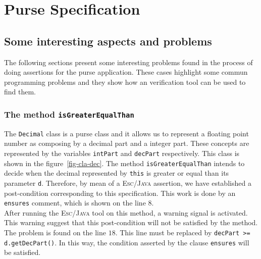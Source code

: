 \section{Purse Specification}
\label{sec-pur-spe}

\subsection{Some interesting aspects and problems}
The following sections present some interesting problems found in the
process
of doing assertions for the purse application. These cases highlight
some commun programming problems and they show how an verification
tool can be used to find them. 

\subsubsection{The method {\tt \bf isGreaterEqualThan}}

The \texttt{Decimal} class is a purse class and it allows us to
represent a floating point number as
composing by a decimal part and a integer part. These concepts are
represented by the variables \texttt{intPart} and \texttt{decPart}
respectively. This class is shown in the figure~\ref{fig-cla-dec}. The
method \texttt{isGreaterEqualThan} intends to decide when the decimal
represented by \texttt{this} is greater or equal than its parameter
\texttt{d}. Therefore, by mean of a \textsc{Esc/Java} assertion, we
have established a post-condition corresponding to this
specification. This work is done by an \texttt{ensures} comment, which
is shown on the line $8$. \\

After running the \textsc{Esc/Java} tool on this method, a warning
signal is activated. This warning suggest that this post-condition
will not be satisfied by the method. The problem is found on the line
$18$. This line must be replaced by \texttt{decPart >=
d.getDecPart()}. In this way, the condition asserted by the clause
\texttt{ensures} will be satisfied.


